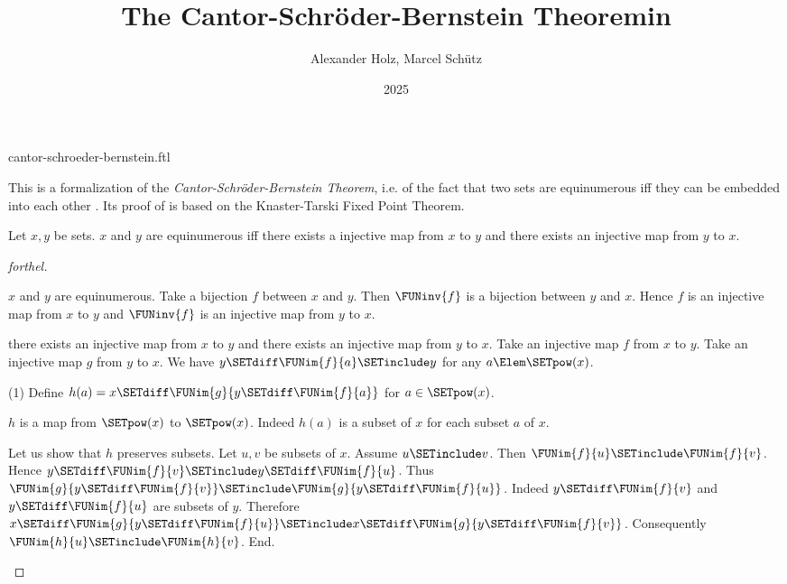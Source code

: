 \documentclass{stex}
\title{The Cantor-Schröder-Bernstein Theoremin \Naproche}
\author{Alexander Holz, Marcel Schütz}
\date{2025}
\begin{document}
\begin{smodule}{cantor-schroeder-bernstein.ftl}
\maketitle



\noindent This is a formalization of the \textit{Cantor-Schröder-Bernstein
Theorem}, i.e. of the fact that two sets are equinumerous iff they can be
embedded into each other \cite{Schroeder2012}.
Its proof of is based on the Knaster-Tarski Fixed Point Theorem.

\begin{theorem}[forthel,title=Cantor-Schröder-Bernstein,name=Cantor-Schroeder-Bernstein]
  Let $x,y$ be sets.
  $x$ and $y$ are equinumerous iff there exists a injective map from $x$ to $y$ and there exists an injective map from $y$ to $x$.
\end{theorem}
\begin{proof}[forthel]
  \begin{case}{$x$ and $y$ are equinumerous.}
    Take a bijection $f$ between $x$ and $y$.
    Then $\FUNinv{f}$ is a bijection between $y$ and $x$.
    Hence $f$ is an injective map from $x$ to $y$ and $\FUNinv{f}$ is an
    injective map from $y$ to $x$.
  \end{case}

  \begin{case}{there exists an injective map from $x$ to $y$ and there exists an injective map from $y$ to $x$.}
    Take an injective map $f$ from $x$ to $y$.
    Take an injective map $g$ from $y$ to $x$.
    We have $y \SETdiff \FUNim{f}{a} \SETinclude y$ for any $a \Elem \SETpow(x)$.

    (1) Define $h(a) = x \SETdiff \FUNim{g}{y \SETdiff \FUNim{f}{a}}$ for $a \in \SETpow(x)$.

    $h$ is a map from $\SETpow(x)$ to $\SETpow(x)$.
    Indeed $h(a)$ is a subset of $x$ for each subset $a$ of $x$.

    Let us show that $h$ preserves subsets.
      Let $u, v$ be subsets of $x$.
      Assume $u \SETinclude v$.
      Then $\FUNim{f}{u} \SETinclude \FUNim{f}{v}$.
      Hence $y \SETdiff \FUNim{f}{v} \SETinclude y \SETdiff \FUNim{f}{u}$.
      Thus $\FUNim{g}{y \SETdiff \FUNim{f}{v}} \SETinclude \FUNim{g}{y \SETdiff \FUNim{f}{u}}$.
      Indeed $y \SETdiff \FUNim{f}{v}$ and $y \SETdiff \FUNim{f}{u}$ are subsets of $y$.
      Therefore $x \SETdiff \FUNim{g}{y \SETdiff \FUNim{f}{u}} \SETinclude x \SETdiff \FUNim{g}{y \SETdiff \FUNim{f}{v}}$.
      Consequently $\FUNim{h}{u} \SETinclude \FUNim{h}{v}$.
    End.


\end{case}
\end{proof}
\end{smodule}
\end{document}

